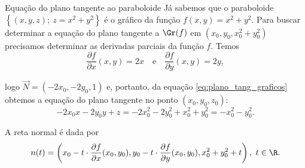 \begin{example}{Equação do plano tangente ao paraboloide}{}
Já sabemos que o paraboloide
$\left\{(x,y,z);~z=x^2+y^2\right\}$
é o gráfico da função $f(x,y)=x^2+y^2$. Para buscar determinar a equação do plano tangente a $\Gr(f)$ em $(x_0,y_0,x_0^2+y_0^2)$ precisamos determinar as derivadas parciais da função $f$. Temos
$$\dfrac{\partial f}{\partial x}(x,y)=2x \quad \mbox{e} \quad \dfrac{\partial f}{\partial y}(x,y)=2y ,$$



logo $\Vec{N}= (-2x_0,-2y_0,1)$
e, portanto, da equação \eqref{eq:plano_tang_graficos} obtemos a equação do plano tangente no ponto $(x_0,y_0,z_0)$:
$$ -2x_0x-2y_0y+z=-2x_0^2-2y_0^2+x_0^2 +y_0^2=-x_0^2-y_0^2.$$

A reta normal é dada por
$$n(t)=\left(x_0-t \cdot \dfrac{\partial f}{\partial x}(x_0,y_0),y_0- t\cdot\dfrac{\partial f}{\partial y}(x_0,y_0), x_0^2+y_0^2+t\right),~t\in\R. $$

\begin{center}
    \begin{comment}\begin{tikzpicture}[tdplot_main_coords,scale=3.0]
		\pgfmathsetmacro{\tini}{0.5*pi}
		\pgfmathsetmacro{\tfin}{1.85*pi}
		\pgfmathsetmacro{\tend}{2.5*pi}
		\draw[-latex] (0,0,0) -- (1.5,0,0) node [below left] {$x$};
		\draw[dashed] (0,0,0) -- (-1.25,0,0);
		\draw[-latex] (0,0,0) -- (0,1.5,0) node [right] {$y$};
		\draw[dashed] (0,0,0) -- (0,-1.25,0);
\draw[thick, green!150,-latex,shift={(1/2,-1/2,1/2)}] (0,0,0)--({-1/3},{-(-1/3)},1/3) node[above,rotate=45]{\footnotesize$(-2x_0,-2y_0,1)$};
  

\end{comment}
\end{center}
\end{example}
